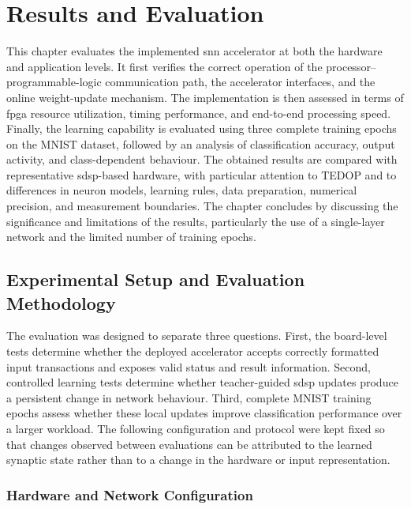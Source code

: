 \chapter{Results and Evaluation}
\label{sec:results_and_evaluation}

This chapter evaluates the implemented \gls{snn} accelerator at both the hardware and application levels. It first verifies the correct operation of the processor--programmable-logic communication path, the accelerator interfaces, and the online weight-update mechanism. The implementation is then assessed in terms of \gls{fpga} resource utilization, timing performance, and end-to-end processing speed. Finally, the learning capability is evaluated using three complete training epochs on the MNIST dataset, followed by an analysis of classification accuracy, output activity, and class-dependent behaviour. The obtained results are compared with representative \gls{sdsp}-based hardware, with particular attention to TEDOP and to differences in neuron models, learning rules, data preparation, numerical precision, and measurement boundaries. The chapter concludes by discussing the significance and limitations of the results, particularly the use of a single-layer network and the limited number of training epochs.

\section{Experimental Setup and Evaluation Methodology}
\label{subsec:experimental-setup}

The evaluation was designed to separate three questions. First, the board-level tests determine whether the deployed accelerator accepts correctly formatted input transactions and exposes valid status and result information. Second, controlled learning tests determine whether teacher-guided \gls{sdsp} updates produce a persistent change in network behaviour. Third, complete MNIST training epochs assess whether these local updates improve classification performance over a larger workload. The following configuration and protocol were kept fixed so that changes observed between evaluations can be attributed to the learned synaptic state rather than to a change in the hardware or input representation.

\subsection{Hardware and Network Configuration}


